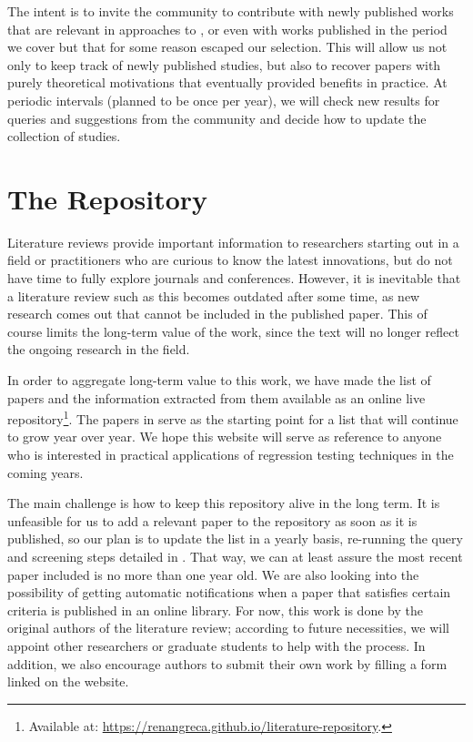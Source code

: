 The intent is to invite the community to contribute with 
newly published works that are relevant in \rea approaches to \rt, or even with works published in the period we cover but that for some reason escaped our selection.
This will allow us not only to keep track of newly published studies, 
but also to recover papers with purely theoretical motivations that eventually provided benefits in practice.
At periodic intervals (planned to be once per year), we will check new results for queries and suggestions from the community and decide how to update the collection of studies.

\section{The Repository}
Literature reviews provide important information to researchers starting out in a field or practitioners who are curious to know the latest innovations, but do not have time to fully explore journals and conferences.
However, it is inevitable that a literature review such as this becomes outdated after some time, as new research comes out that cannot be included in the published paper.
This of course limits the long-term value of the work, since the text will no longer reflect the ongoing research in the field.

In order to aggregate long-term value to this work, we have made the list of papers and the information extracted from them available as an online live repository\footnote{Available at: \url{https://renangreca.github.io/literature-repository}.}.
The papers in  serve as the starting point for a list that will continue to grow year over year.
We hope this website will serve as reference to anyone who is interested in practical applications of regression testing techniques in the coming years.

The main challenge is how to keep this repository alive in the long term.
It is unfeasible for us to add a relevant paper to the repository as soon as it is published, so our plan is to update the list in a yearly basis, re-running the query and screening steps detailed in .
That way, we can at least assure the most recent paper included is no more than one year old.
We are also looking into the possibility of getting automatic notifications when a paper that satisfies certain criteria is published in an online library.
For now, this work is done by the original authors of the literature review; according to future necessities, we will appoint other researchers or graduate students to help with the process.
In addition, we also encourage authors to submit their own work by filling a form linked on the website.


